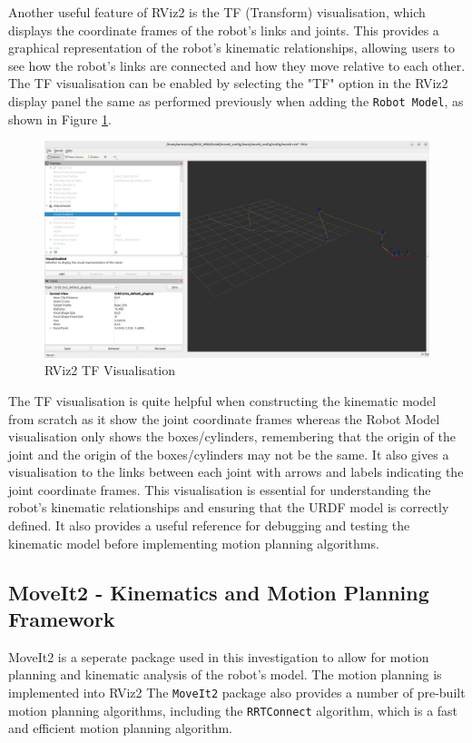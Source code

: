 \documentclass[10pt,a4paper,english]{article}
\begin{document}
Another useful feature of RViz2 is the TF (Transform) visualisation, which displays the coordinate frames of the robot's links and joints. This provides a graphical representation of the robot's kinematic relationships, allowing users to see how the robot's links are connected and how they move relative to each other. The TF visualisation can be enabled by selecting the "TF" option in the RViz2 display panel the same as performed previously when adding the \texttt{Robot Model}, as shown in Figure \ref{fig:rviz2_tf_visualisation}.

\begin{figure}[ht]
    \centering
    \includegraphics[width=1.0\textwidth]{TF_Visualisation.png}
    \caption{RViz2 TF Visualisation}
    \label{fig:rviz2_tf_visualisation}
\end{figure}

The TF visualisation is quite helpful when constructing the kinematic model from scratch as it show the joint coordinate frames whereas the Robot Model visualisation only shows the boxes/cylinders, remembering that the origin of the joint and the origin of the boxes/cylinders may not be the same. It also gives a visualisation to the links between each joint with arrows and labels indicating the joint coordinate frames. This visualisation is essential for understanding the robot's kinematic relationships and ensuring that the URDF model is correctly defined. It also provides a useful reference for debugging and testing the kinematic model before implementing motion planning algorithms.
\newpage


\subsection{MoveIt2 - Kinematics and Motion Planning Framework}
MoveIt2 is a seperate package used in this investigation to allow for motion planning and kinematic analysis of the robot's model. The motion planning is implemented into RViz2 
The \texttt{MoveIt2} package also provides a number of pre-built motion planning algorithms, including the \texttt{RRTConnect} algorithm, which is a fast and efficient motion planning algorithm.
\end{document}

